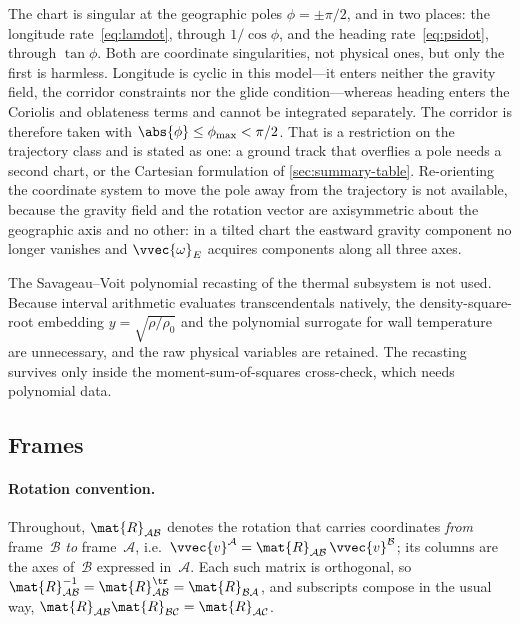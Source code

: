 The chart is singular at the geographic poles $\phi = \pm\pi/2$, and in two
places: the longitude rate~\cref{eq:lamdot}, through $1/\cos\phi$, and the
heading rate~\cref{eq:psidot}, through $\tan\phi$. Both are coordinate
singularities, not physical ones, but only the first is harmless.
Longitude is cyclic in this model---it enters neither the gravity field,
the corridor constraints nor the glide condition---whereas heading enters
the Coriolis and oblateness terms and cannot be integrated separately. The
corridor is therefore taken with $\abs{\phi}\le\phi_{\max}<\pi/2$. That is
a restriction on the trajectory class and is stated as one: a ground track
that overflies a pole needs a second chart, or the Cartesian formulation of
\cref{sec:summary-table}. Re-orienting the coordinate system to move the
pole away from the trajectory is not available, because the gravity field
and the rotation vector are axisymmetric about the geographic axis and no
other: in a tilted chart the eastward gravity component no longer vanishes
and $\vvec{\omega}_E$ acquires components along all three axes.

The Savageau--Voit polynomial recasting of the thermal subsystem is not
used. Because interval arithmetic evaluates transcendentals natively,
the density-square-root embedding $y = \sqrt{\rho/\rho_0}$ and the
polynomial surrogate for wall temperature are unnecessary, and the raw
physical variables are retained. The recasting survives only inside the
moment-sum-of-squares cross-check, which needs polynomial data.


\subsection{Frames}\label{sec:frames}

\paragraph{Rotation convention.}
Throughout, $\mat{R}_{\mathcal{A}\mathcal{B}}$ denotes the rotation that
carries coordinates \emph{from} frame~$\mathcal{B}$ \emph{to}
frame~$\mathcal{A}$, i.e.\ $\vvec{v}^{\mathcal{A}} =
\mat{R}_{\mathcal{A}\mathcal{B}}\,\vvec{v}^{\mathcal{B}}$; its columns are the
axes of~$\mathcal{B}$ expressed in~$\mathcal{A}$. Each such matrix is
orthogonal, so $\mat{R}_{\mathcal{A}\mathcal{B}}^{-1} =
\mat{R}_{\mathcal{A}\mathcal{B}}^{\tr} = \mat{R}_{\mathcal{B}\mathcal{A}}$,
and subscripts compose in the usual way,
$\mat{R}_{\mathcal{A}\mathcal{B}}\mat{R}_{\mathcal{B}\mathcal{C}} =
\mat{R}_{\mathcal{A}\mathcal{C}}$.

